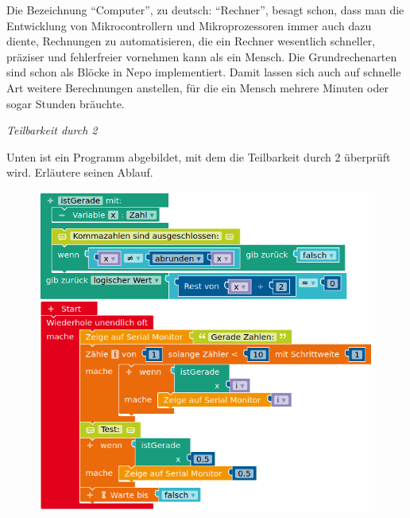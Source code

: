 Die Bezeichnung \enquote{Computer}, zu deutsch: \enquote{Rechner}, besagt schon, dass man die Entwicklung von Mikrocontrollern und Mikroprozessoren immer auch dazu diente, Rechnungen zu automatisieren, die ein Rechner wesentlich schneller, präziser und fehlerfreier vornehmen kann als ein Mensch. Die Grundrechenarten sind schon als Blöcke in Nepo implementiert. Damit lassen sich auch auf schnelle Art weitere Berechnungen anstellen, für die ein Mensch mehrere Minuten oder sogar Stunden bräuchte.

\begin{aufgabe} \emph{Teilbarkeit durch 2}
	
	Unten ist ein Programm abgebildet, mit dem die Teilbarkeit durch 2 überprüft wird. Erläutere seinen Ablauf.
\end{aufgabe}

\begin{figure}[H]
	\centering
	\includegraphics[width=0.7\linewidth]{./pics/istGerade.png}
\end{figure}

